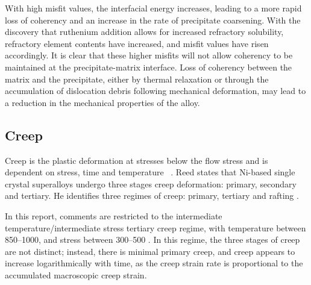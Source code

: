 With high misfit values, the interfacial energy increases, leading to a more rapid loss of coherency and an increase in the rate of precipitate coarsening.  With the discovery that ruthenium addition allows for increased refractory solubility, refractory element contents have increased, and misfit values have risen accordingly.  It is clear that these higher misfits will not allow coherency to be maintained at the precipitate-matrix interface.  Loss of coherency between the matrix and the precipitate, either by thermal relaxation or through the accumulation of dislocation debris following mechanical deformation, may lead to a reduction in the mechanical properties of the alloy.

\subsection{Creep}

Creep is the plastic deformation at stresses below the flow stress and is dependent on stress, time and temperature ~\cite{nabarro96}.  Reed states that Ni-based single crystal superalloys undergo three stages creep deformation: primary, secondary and tertiary.  He identifies three regimes of creep: primary, tertiary and rafting \cite{reed99}.  

In this report, comments are restricted to the intermediate temperature/intermediate stress tertiary creep regime, with temperature between 850--1000\celsius, and stress between 300--500 \mega\pascal.  In this regime, the three stages of creep are not distinct; instead, there is minimal primary creep, and creep appears to increase logarithmically with time, as the creep strain rate is proportional to the accumulated macroscopic creep strain.

